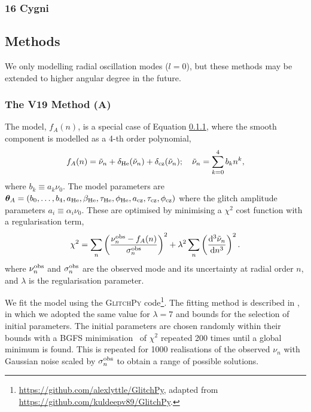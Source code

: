 \subsubsection{16 Cygni}

\subsection{Methods}

We only modelling radial oscillation modes (\(l = 0\)), but these methods may be extended to higher angular degree in the future.

\subsubsection{The V19 Method (A)}

The model, \(f_{A}(n)\), is a special case of Equation \ref{}, where the smooth component is modelled as a 4-th order polynomial,
%
\begin{equation}
    f_A(n) = \tilde{\nu}_n + \delta_{{\mathrm{He}}}(\tilde{\nu}_n) + \delta_{{\mathrm{cz}}}(\tilde{\nu}_n);\quad \tilde{\nu}_n = \sum_{k=0}^{4} b_k n^k,
\end{equation}
%
where \(b_k \equiv a_k \nu_0\). The model parameters are \(\bm{\theta}_A = (b_0, \dots, b_4, a_{{\mathrm{He}}}, \beta_{{\mathrm{He}}}, \tau_{{\mathrm{He}}}, \phi_{{\mathrm{He}}}, a_{{\mathrm{cz}}}, \tau_{{\mathrm{cz}}}, \phi_{{\mathrm{cz}}})\) where the glitch amplitude parameters \(a_i \equiv \alpha_i\nu_0\). These are optimised by minimising a \(\chi^2\) cost function with a regularisation term, 
%
\begin{equation}
    \chi^2 = \sum_n \left( \frac{\nu_n^{{\mathrm{obs}}} - f_{A}(n)}{\sigma_n^{{\mathrm{obs}}}} \right)^2 + \lambda^2 \sum_n \left( \frac{\mathrm{d}^3 \tilde{\nu}_n}{\mathrm{d} n^3} \right)^2.
\end{equation}
%
where \(\nu_n^{{\mathrm{obs}}}\) and \(\sigma_n^{{\mathrm{obs}}}\) are the observed mode and its uncertainty at radial order \(n\), and \(\lambda\) is the regularisation parameter.

We fit the model using the \textsc{GlitchPy} code\footnote{\url{https://github.com/alexlyttle/GlitchPy}, adapted from \url{https://github.com/kuldeepv89/GlitchPy}.}. The fitting method is described in \citet{Verma.Raodeo.ea2019}, in which we adopted the same value for \(\lambda=7\) and bounds for the selection of initial parameters. The initial parameters are chosen randomly within their bounds with a BGFS minimisation \needcite~of \(\chi^2\) repeated 200 times until a global minimum is found. This is repeated for 1000 realisations of the observed \(\nu_n\) with Gaussian noise scaled by \(\sigma_n^{{\mathrm{obs}}}\) to obtain a range of possible solutions.

